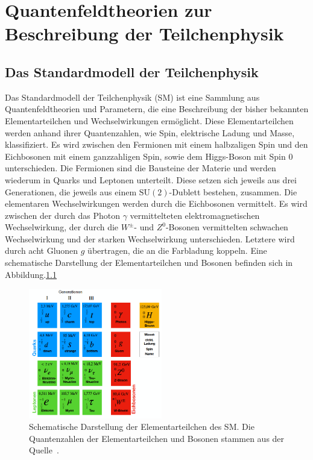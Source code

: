 \chapter{Quantenfeldtheorien zur Beschreibung der Teilchenphysik}
\section{Das Standardmodell der Teilchenphysik}
Das Standardmodell der Teilchenphysik (SM) ist eine Sammlung aus Quantenfeldtheorien und Parametern, die eine Beschreibung der bisher bekannten Elementarteilchen und Wechselwirkungen ermöglicht. Diese Elementarteilchen werden anhand ihrer Quantenzahlen, wie Spin, elektrische Ladung und Masse, klassifiziert.
Es wird zwischen den Fermionen mit einem halbzaligen Spin und den Eichbosonen mit einem ganzzahligen Spin, sowie dem Higgs-Boson mit Spin $0$ unterschieden. Die Fermionen sind die Bausteine der Materie und werden wiederum in Quarks und Leptonen unterteilt. Diese setzen sich jeweils aus drei Generationen, die jeweils aus einem $\text{SU}(2)$-Dublett bestehen, zusammen.
Die elementaren Wechselwirkungen werden durch die Eichbosonen vermittelt. Es wird zwischen der durch das Photon $\gamma$ vermittelteten elektromagnetischen Wechselwirkung, der durch die $W^{\pm}$- und $Z^0$-Bosonen vermittelten schwachen Wechselwirkung und der starken Wechselwirkung unterschieden. Letztere wird durch acht Gluonen $g$ übertragen, die an die Farbladung koppeln. Eine schematische Darstellung der Elementarteilchen und Bosonen befinden sich in Abbildung.\ref{fig:SM}\\
\begin{figure}[H]
  \centering
  \includegraphics[width=0.52\textwidth]{Plots/SM.png}
  \caption{Schematische Darstellung der Elementarteilchen des SM. Die Quantenzahlen der Elementarteilchen und Bosonen stammen aus der Quelle~\cite{Patrignani:2016xqp}.}
  \label{fig:SM}
\end{figure}
